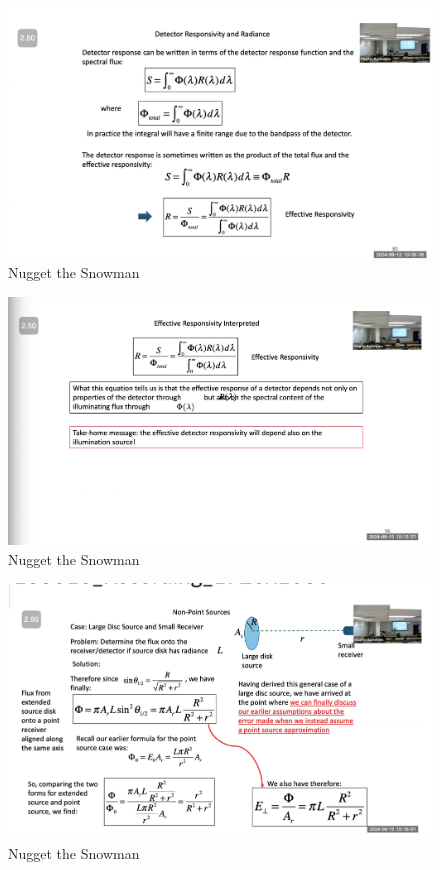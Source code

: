 \documentclass{article}
\begin{document}
\begin{figure}[h!]
\centering
\includegraphics[scale=.6]{Radiometry/Week3/Notes/Sept12Responsivity.png}
\caption{Nugget the Snowman}
\label{fig:Sept Responsivity}
\end{figure}

\begin{figure}[h!]
\centering
\includegraphics[scale=.6]{Radiometry/Week3/Notes/LightSourceResponsivity.png}
\caption{Nugget the Snowman}
\label{fig:Light Source Responsivity}
\end{figure}


\begin{figure}[h!]
\centering
\includegraphics[scale=.6]{Radiometry/Week3/Notes/Mainpoint.png}
\caption{Nugget the Snowman}
\label{fig:Light Source Responsivity}
\end{figure}
\clearpage
\end{document}

